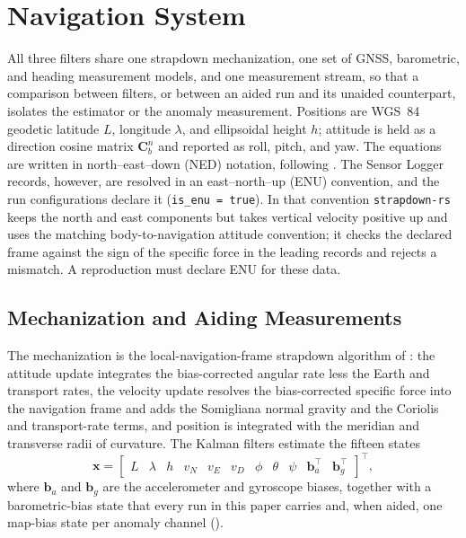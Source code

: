 \section{Navigation System}
\label{sec:navigation}

All three filters share one strapdown mechanization, one set of GNSS, barometric, and heading measurement models, and one measurement stream, so that a comparison between filters, or between an aided run and its unaided counterpart, isolates the estimator or the anomaly measurement. Positions are WGS~84 geodetic latitude \(L\), longitude \(\lambda\), and ellipsoidal height \(h\); attitude is held as a direction cosine matrix \(\mathbf{C}_b^n\) and reported as roll, pitch, and yaw. The equations are written in north--east--down (NED) notation, following \citet{groves_ch5}. The Sensor Logger records, however, are resolved in an east--north--up (ENU) convention, and the run configurations declare it (\texttt{is\_enu = true}). In that convention \texttt{strapdown-rs} keeps the north and east components but takes vertical velocity positive up and uses the matching body-to-navigation attitude convention; it checks the declared frame against the sign of the specific force in the leading records and rejects a mismatch. A reproduction must declare ENU for these data.

\subsection{Mechanization and Aiding Measurements}

The mechanization is the local-navigation-frame strapdown algorithm of \citet[Sections~5.4--5.5]{groves_ch5}: the attitude update integrates the bias-corrected angular rate less the Earth and transport rates, the velocity update resolves the bias-corrected specific force into the navigation frame and adds the Somigliana normal gravity and the Coriolis and transport-rate terms, and position is integrated with the meridian and transverse radii of curvature. The Kalman filters estimate the fifteen states
\begin{equation}
  \mathbf{x} = \begin{bmatrix} L & \lambda & h & v_N & v_E & v_D & \phi & \theta & \psi & \mathbf{b}_a^\top & \mathbf{b}_g^\top \end{bmatrix}^\top,
  \label{eqn:state}
\end{equation}
where \(\mathbf{b}_a\) and \(\mathbf{b}_g\) are the accelerometer and gyroscope biases, together with a barometric-bias state that every run in this paper carries and, when aided, one map-bias state per anomaly channel ().

